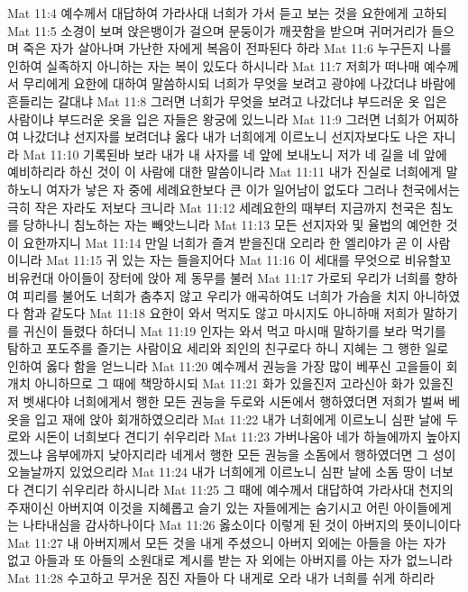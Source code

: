 Mat 11:4  예수께서 대답하여 가라사대 너희가 가서 듣고 보는 것을 요한에게 고하되
Mat 11:5  소경이 보며 앉은뱅이가 걸으며 문둥이가 깨끗함을 받으며 귀머거리가 들으며 죽은 자가 살아나며 가난한 자에게 복음이 전파된다 하라
Mat 11:6  누구든지 나를 인하여 실족하지 아니하는 자는 복이 있도다 하시니라
Mat 11:7  저희가 떠나매 예수께서 무리에게 요한에 대하여 말씀하시되 너희가 무엇을 보려고 광야에 나갔더냐 바람에 흔들리는 갈대냐
Mat 11:8  그러면 너희가 무엇을 보려고 나갔더냐 부드러운 옷 입은 사람이냐 부드러운 옷을 입은 자들은 왕궁에 있느니라
Mat 11:9  그러면 너희가 어찌하여 나갔더냐 선지자를 보려더냐 옳다 내가 너희에게 이르노니 선지자보다도 나은 자니라
Mat 11:10  기록된바 보라 내가 내 사자를 네 앞에 보내노니 저가 네 길을 네 앞에 예비하리라 하신 것이 이 사람에 대한 말씀이니라
Mat 11:11  내가 진실로 너희에게 말하노니 여자가 낳은 자 중에 세례요한보다 큰 이가 일어남이 없도다 그러나 천국에서는 극히 작은 자라도 저보다 크니라
Mat 11:12  세례요한의 때부터 지금까지 천국은 침노를 당하나니 침노하는 자는 빼앗느니라
Mat 11:13  모든 선지자와 및 율법의 예언한 것이 요한까지니
Mat 11:14  만일 너희가 즐겨 받을진대 오리라 한 엘리야가 곧 이 사람이니라
Mat 11:15  귀 있는 자는 들을지어다
Mat 11:16  이 세대를 무엇으로 비유할꼬 비유컨대 아이들이 장터에 앉아 제 동무를 불러
Mat 11:17  가로되 우리가 너희를 향하여 피리를 불어도 너희가 춤추지 않고 우리가 애곡하여도 너희가 가슴을 치지 아니하였다 함과 같도다
Mat 11:18  요한이 와서 먹지도 않고 마시지도 아니하매 저희가 말하기를 귀신이 들렸다 하더니
Mat 11:19  인자는 와서 먹고 마시매 말하기를 보라 먹기를 탐하고 포도주를 즐기는 사람이요 세리와 죄인의 친구로다 하니 지혜는 그 행한 일로 인하여 옳다 함을 얻느니라
Mat 11:20  예수께서 권능을 가장 많이 베푸신 고을들이 회개치 아니하므로 그 때에 책망하시되
Mat 11:21  화가 있을진저 고라신아 화가 있을진저 벳새다야 너희에게서 행한 모든 권능을 두로와 시돈에서 행하였더면 저희가 벌써 베옷을 입고 재에 앉아 회개하였으리라
Mat 11:22  내가 너희에게 이르노니 심판 날에 두로와 시돈이 너희보다 견디기 쉬우리라
Mat 11:23  가버나움아 네가 하늘에까지 높아지겠느냐 음부에까지 낮아지리라 네게서 행한 모든 권능을 소돔에서 행하였더면 그 성이 오늘날까지 있었으리라
Mat 11:24  내가 너희에게 이르노니 심판 날에 소돔 땅이 너보다 견디기 쉬우리라 하시니라
Mat 11:25  그 때에 예수께서 대답하여 가라사대 천지의 주재이신 아버지여 이것을 지혜롭고 슬기 있는 자들에게는 숨기시고 어린 아이들에게는 나타내심을 감사하나이다
Mat 11:26  옳소이다 이렇게 된 것이 아버지의 뜻이니이다
Mat 11:27  내 아버지께서 모든 것을 내게 주셨으니 아버지 외에는 아들을 아는 자가 없고 아들과 또 아들의 소원대로 계시를 받는 자 외에는 아버지를 아는 자가 없느니라
Mat 11:28  수고하고 무거운 짐진 자들아 다 내게로 오라 내가 너희를 쉬게 하리라
